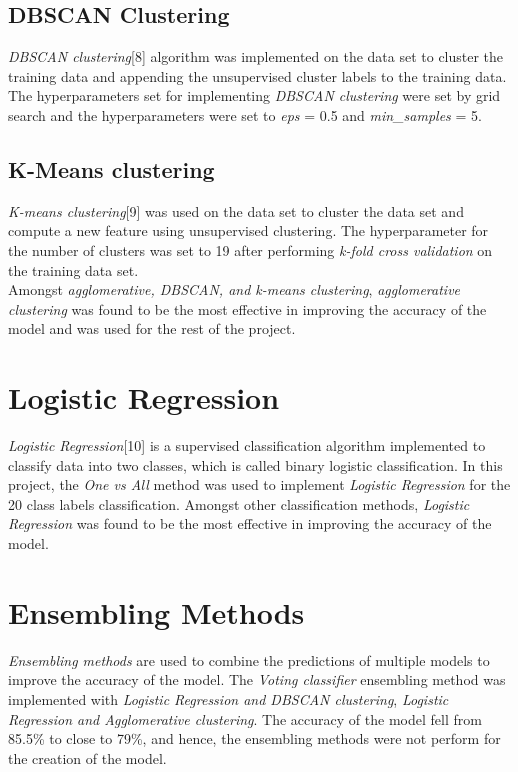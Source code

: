 \documentclass[conference]{IEEEtran}
\begin{document}
\subsection{DBSCAN Clustering}
    \textit{DBSCAN clustering}[8] algorithm was implemented on the data set to cluster the training data and appending the unsupervised cluster labels to the training data. The hyperparameters set for implementing \textit{DBSCAN clustering} were set by grid search and the hyperparameters were set to \textit{eps} = 0.5 and \textit{min\_samples} = 5.
\subsection{K-Means clustering}
    \textit{K-means clustering}[9] was used on the data set to cluster the data set and compute a new feature using unsupervised clustering. The hyperparameter for the number of clusters was set to 19 after performing \textit{k-fold cross validation} on the training data set. 
\\ Amongst \textit{agglomerative, DBSCAN, and k-means clustering}, \textit{agglomerative clustering} was found to be the most effective in improving the accuracy of the model and was used for the rest of the project.

\section{Logistic Regression} 
    \textit{Logistic Regression}[10]  is a supervised classification algorithm implemented to classify data into two classes, which is called binary logistic classification. In this project, the \textit{One vs All} method was used to implement \textit{Logistic Regression} for the 20 class labels classification. Amongst other classification methods, \textit{Logistic Regression} was found to be the most effective in improving the accuracy of the model.

\section{Ensembling Methods}
    \textit{Ensembling methods} are used to combine the predictions of multiple models to improve the accuracy of the model. 
    The \textit{Voting classifier} ensembling method was implemented with \textit{Logistic Regression and DBSCAN clustering}, \textit{Logistic Regression and Agglomerative clustering}. The accuracy of the model fell from 85.5\% to close to 79\%, and hence, the ensembling methods were not perform for the creation of the model. 
\end{document}
